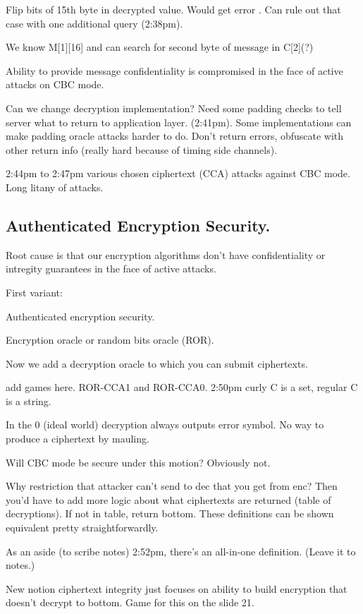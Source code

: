 Flip bits of 15th byte in decrypted value. Would get error . Can rule out that case with one additional query (2:38pm).

We know M[1][16] and can search for second byte of message in C[2](?)

Ability to provide message confidentiality is compromised in the face of active attacks on CBC mode.

Can we change decryption implementation? Need some padding checks to tell server what to return to application layer. (2:41pm). Some implementations can make padding oracle attacks harder to do. Don't return errors, obfuscate with other return info (really hard because of timing side channels).

2:44pm to 2:47pm various chosen ciphertext (CCA) attacks against CBC mode. Long litany of attacks.

\subsection{Authenticated Encryption Security.}

Root cause is that our encryption algorithms don't have confidentiality or intregity guarantees in the face of active attacks.

First variant:

Authenticated encryption security.

Encryption oracle or random bits oracle (ROR).

Now we add a decryption oracle to which you can submit ciphertexts.

add games here.
ROR-CCA1 and ROR-CCA0.
2:50pm curly C is a set, regular C is a string.

In the 0 (ideal world) decryption always outputs error symbol. No way to produce a ciphertext by mauling.

Will CBC mode be secure under this motion? Obviously not.

Why restriction that attacker can't send to dec that you get from enc? Then you'd have to add more logic about what ciphertexts are returned (table of decryptions). If not in table, return bottom. These definitions can be shown equivalent pretty straightforwardly.


As an aside (to scribe notes) 2:52pm, there's an all-in-one definition. (Leave it to notes.)

New notion ciphertext integrity just focuses on ability to build encryption that doesn't decrypt to bottom. Game for this on the slide 21. 

